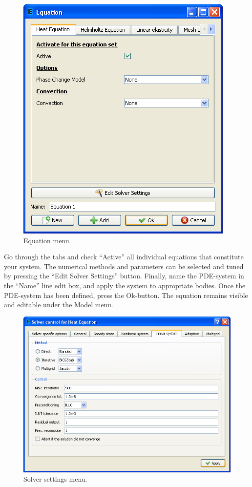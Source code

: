 \documentclass[a4paper,12pt]{article}
\begin{document}
\begin{figure}[ht]
\begin{center}
 \includegraphics[scale=0.5]{images/equation.png}
\caption{Equation menu.}
\end{center}
\end{figure}

Go through the tabs and check ``Active'' all individual equations that constitute your
system. The numerical methods and parameters can be selected and tuned by pressing the
``Edit Solver Settings'' button. Finally, name the PDE-system in the ``Name'' line edit
box, and apply the system to appropriate bodies. Once the PDE-system has been defined,
press the Ok-button. The equation remains visible and editable under the Model menu.

\begin{figure}[ht]
\begin{center}
 \includegraphics[scale=0.5]{images/solversettings.png}
\caption{Solver settings menu.}
\end{center}
\end{figure}
\end{document}
